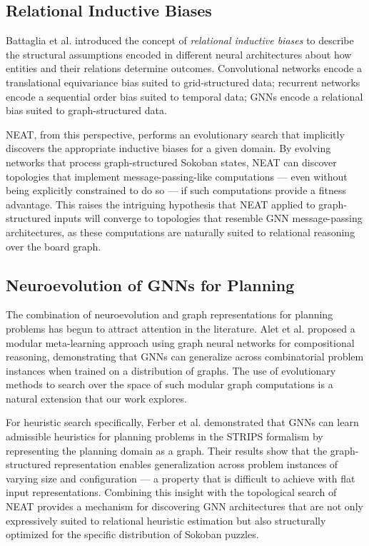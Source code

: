 \subsection{Relational Inductive Biases}

Battaglia et al. \cite{battaglia2018relational} introduced the concept of \textit{relational inductive biases} to describe the structural assumptions encoded in different neural architectures about how entities and their relations determine outcomes. Convolutional networks encode a translational equivariance bias suited to grid-structured data; recurrent networks encode a sequential order bias suited to temporal data; GNNs encode a relational bias suited to graph-structured data.

NEAT, from this perspective, performs an evolutionary search that implicitly discovers the appropriate inductive biases for a given domain. By evolving networks that process graph-structured Sokoban states, NEAT can discover topologies that implement message-passing-like computations --- even without being explicitly constrained to do so --- if such computations provide a fitness advantage. This raises the intriguing hypothesis that NEAT applied to graph-structured inputs will converge to topologies that resemble GNN message-passing architectures, as these computations are naturally suited to relational reasoning over the board graph.

\subsection{Neuroevolution of GNNs for Planning}

The combination of neuroevolution and graph representations for planning problems has begun to attract attention in the literature. Alet et al. \cite{alet2019graph} proposed a modular meta-learning approach using graph neural networks for compositional reasoning, demonstrating that GNNs can generalize across combinatorial problem instances when trained on a distribution of graphs. The use of evolutionary methods to search over the space of such modular graph computations is a natural extension that our work explores.

For heuristic search specifically, Ferber et al. \cite{ferber2020neural} demonstrated that GNNs can learn admissible heuristics for planning problems in the STRIPS formalism by representing the planning domain as a graph. Their results show that the graph-structured representation enables generalization across problem instances of varying size and configuration --- a property that is difficult to achieve with flat input representations. Combining this insight with the topological search of NEAT provides a mechanism for discovering GNN architectures that are not only expressively suited to relational heuristic estimation but also structurally optimized for the specific distribution of Sokoban puzzles.

